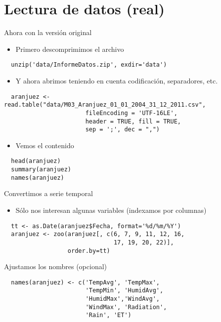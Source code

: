 \documentclass[xcolor={usenames,svgnames,dvipsnames}]{beamer}
\begin{document}
\section{Lectura de datos (real)}
\label{sec-2}
\begin{frame}[fragile,label=sec-2-1]{Ahora con la versión original}
 \begin{itemize}
\item Primero descomprimimos el archivo
\end{itemize}
\lstset{language=R,label= ,caption= ,numbers=none}
\begin{lstlisting}
  unzip('data/InformeDatos.zip', exdir='data')
\end{lstlisting}
\begin{itemize}
\item Y ahora abrimos teniendo en cuenta codificación, separadores, etc.
\end{itemize}
\lstset{language=R,label= ,caption= ,numbers=none}
\begin{lstlisting}
  aranjuez <- read.table("data/M03_Aranjuez_01_01_2004_31_12_2011.csv",
                       fileEncoding = 'UTF-16LE',
                       header = TRUE, fill = TRUE,
                       sep = ';', dec = ",")
\end{lstlisting}
\begin{itemize}
\item Vemos el contenido
\end{itemize}
\lstset{language=R,label= ,caption= ,numbers=none}
\begin{lstlisting}
  head(aranjuez)
  summary(aranjuez)
  names(aranjuez)
\end{lstlisting}
\end{frame}

\begin{frame}[fragile,label=sec-2-2]{Convertimos a serie temporal}
 \begin{itemize}
\item Sólo nos interesan algunas variables (indexamos por columnas)
\end{itemize}
\lstset{language=R,label= ,caption= ,numbers=none}
\begin{lstlisting}
  tt <- as.Date(aranjuez$Fecha, format='%d/%m/%Y')
  aranjuez <- zoo(aranjuez[, c(6, 7, 9, 11, 12, 16,
                               17, 19, 20, 22)],
                  order.by=tt)
\end{lstlisting}
\end{frame}

\begin{frame}[fragile,label=sec-2-3]{Ajustamos los nombres (opcional)}
 \lstset{language=R,label= ,caption= ,numbers=none}
\begin{lstlisting}
  names(aranjuez) <- c('TempAvg', 'TempMax',
                       'TempMin', 'HumidAvg',
                       'HumidMax','WindAvg',
                       'WindMax', 'Radiation',
                       'Rain', 'ET')
\end{lstlisting}
\end{frame}
\end{document}
